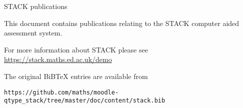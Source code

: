 \documentclass[11pt]{article}
\newcommand{\localputbib}{%
\putbib[stack]
}
\begin{document}


\centerline{\Large STACK publications}
$~$\\[1cm]

This document contains publications relating to the STACK computer aided assessment system.

For more information about STACK please see \href{https://stack.maths.ed.ac.uk/demo}{https://stack.maths.ed.ac.uk/demo}

The original BiBTeX entries are available from
{\scriptsize
\begin{verbatim}
https://github.com/maths/moodle-qtype_stack/tree/master/doc/content/stack.bib
\end{verbatim}
}

\renewcommand\refname{\normalsize Suggestions of where to start}
\begin{bibunit}[unsrt]
\nocite{kinnear_george_2019_2565969,2017MCQ,2013CAA}
\localputbib
\end{bibunit}

\renewcommand\refname{\normalsize Books}
\begin{bibunit}[unsrt]
\nocite{2013CAA,Nakamura2010}
\localputbib
\end{bibunit}

\renewcommand\refname{\normalsize Specific issues}
\begin{bibunit}[unsrt]
\nocite{SangwinRamsden2006,Nakamura2016b,2017STACKUnits,2018Sangwin-equivalence-proof,Sangwin2015Inequalities}
\localputbib
\end{bibunit}

\renewcommand\refname{\normalsize STACK and Examinations}
\begin{bibunit}[unsrt]
\nocite{2016AutomationExaminations,Sangwin2019CERME,Sangwin2018CMEEI}
\localputbib
\end{bibunit}

\renewcommand\refname{\normalsize Research and conference papers}
\begin{bibunit}[unsrt]
\nocite{2018Mastery,Yoshitomi2018,Barbas2016,Nakamura2016,Sangwin2015KHDM}
\nocite{Rasila2016,Rasila2016b,Rasila2016c}
\nocite{Shirai2015a,Shirai2015b,Pavia2015,Nakamura2014,Shirai2014,Nakamura2013}
\nocite{Sangwin2012ICME,Sangwin2013HEA,Lowe2010,Sangwin2009Equality,Sangwin2010IGI,Nakamura2010b}
\nocite{Rasila2010,Sangwin2009Calculumus,Sangwin2009ICMI,Rasila2007}
\nocite{Sangwin2006CASAlgebra,WebALT2006,Sangwin2006UniServe,SangwinTMA03,SangwinHSkills02}
\nocite{lowe_mestel_2019,erskine_mestel_2018,Paiva2017}
\localputbib
\end{bibunit}
\end{document}
